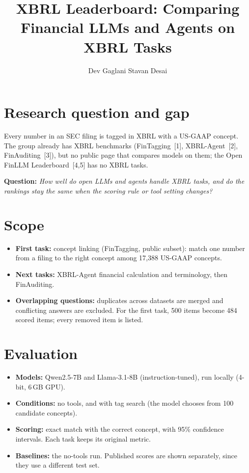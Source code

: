 \documentclass[10pt]{article}
\title{\vspace{-1.5cm}\large\textbf{XBRL Leaderboard: Comparing Financial LLMs and Agents on XBRL Tasks}}
\author{\normalsize Dev Gaglani \quad Stavan Desai}
\date{}
\begin{document}
\maketitle
\vspace{-1.3cm}

\section{Research question and gap}
Every number in an SEC filing is tagged in XBRL with a US-GAAP concept. The group already has XBRL benchmarks
(FinTagging~[1], XBRL-Agent~[2], FinAuditing~[3]), but no public page that compares models on them; the Open FinLLM
Leaderboard~[4,5] has no XBRL tasks.

\textbf{Question:} \emph{How well do open LLMs and agents handle XBRL tasks, and do the rankings stay the same when the
scoring rule or tool setting changes?}

\section{Scope}
\begin{itemize}
\item \textbf{First task:} concept linking (FinTagging, public subset): match one number from a filing to the right
concept among 17{,}388 US-GAAP concepts.
\item \textbf{Next tasks:} XBRL-Agent financial calculation and terminology, then FinAuditing.
\item \textbf{Overlapping questions:} duplicates across datasets are merged and conflicting answers are excluded. For
the first task, 500 items become 484 scored items; every removed item is listed.
\end{itemize}

\section{Evaluation}
\begin{itemize}
\item \textbf{Models:} Qwen2.5-7B and Llama-3.1-8B (instruction-tuned), run locally (4-bit, 6\,GB GPU).
\item \textbf{Conditions:} no tools, and with tag search (the model chooses from 100 candidate concepts).
\item \textbf{Scoring:} exact match with the correct concept, with 95\% confidence intervals. Each task keeps its
original metric.
\item \textbf{Baselines:} the no-tools run. Published scores are shown separately, since they use a different test set.
\end{itemize}
\end{document}
